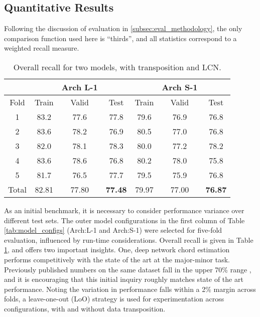 \subsection{Quantitative Results}
\label{subsec:quantitative_results}

Following the discussion of evaluation in \ref{subsec:eval_methodology}, the only comparison function used here is ``thirds'', and all statistics correspond to a weighted recall measure.

\begin{table}[!t]
\caption{Overall recall for two models, with transposition and LCN.}
\label{tab:exp1res}
\centering
\begin{tabular}{c || c c c || c c c |}
 & & Arch L-1 & & & Arch S-1 & \\
 \hline
Fold & Train & Valid & Test & Train & Valid & Test \\
\hline
1 & 83.2 & 77.6 & 77.8 &  79.6 & 76.9 & 76.8 \\
2 & 83.6 & 78.2 & 76.9 & 80.5 & 77.0 & 76.8 \\
3 & 82.0 & 78.1 & 78.3 & 80.0 & 77.2 & 78.2\\
4 & 83.6 & 78.6 & 76.8 & 80.2 & 78.0 & 75.8 \\
5 & 81.7 & 76.5 & 77.7 & 79.5 & 75.9 & 76.8 \\
\hline
Total &  82.81 & 77.80 & \textbf{77.48} & 79.97 & 77.00 & \textbf{76.87}\\
\hline
\end{tabular}
\end{table}

As an initial benchmark, it is necessary to consider performance variance over different test sets.
The outer model configurations in the first column of Table \ref{tab:model_configs} (Arch:L-1 and Arch:S-1) were selected for five-fold evaluation, influenced by run-time considerations.
Overall recall is given in Table \ref{tab:exp1res}, and offers two important insights.
One, deep network chord estimation performs competitively with the state of the art at the major-minor task.
Previously published numbers on the same dataset fall in the upper 70\% range \cite{Cho2010Exploring}, and it is encouraging that this initial inquiry roughly matches state of the art performance.
Noting the variation in performance falls within a 2\% margin across folds, a leave-one-out (LoO) strategy is used for experimentation across configurations, with and without data transposition.

